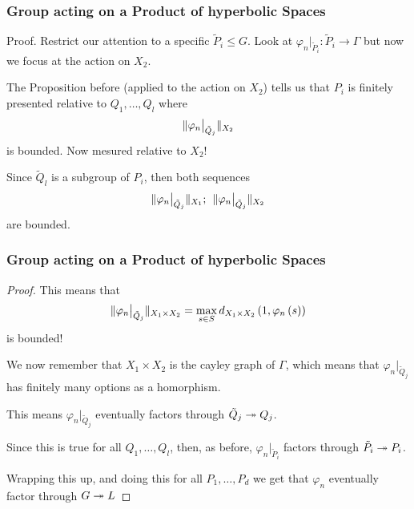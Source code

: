 \documentclass{beamer}[10]
\begin{document}
\begin{frame}
    \frametitle{Group acting on a Product of hyperbolic Spaces}
    \begin{block}{Proof.}
        Restrict our attention to a specific $\tilde{P}_i \leq G$. \pause
        Look at $\varphi_{n}\big\vert_{\tilde{P}_i}: \tilde{P}_i \to \Gamma$ but now we focus at the action on $X_2$. \pause

        The Proposition before (applied to the action on $X_2$) tells us that $P_i$ is finitely presented relative to $Q_1, \ldots, Q_l$ where
        \begin{equation*}
            \lVert \varphi_{n}\big\vert_{\tilde{Q}_j} \rVert_{X_2}
        \end{equation*}
        is bounded. Now mesured relative to $X_2$! \pause

        Since $\tilde{Q}_l$ is a subgroup of $P_i$, then both sequences
        \begin{equation*}
            \lVert \varphi_{n}\big\vert_{\tilde{Q}_j} \rVert_{X_1};\hspace{1ex}\lVert \varphi_{n}\big\vert_{\tilde{Q}_j} \rVert_{X_2}
        \end{equation*}
        are bounded. 
    \end{block}
\end{frame}

\begin{frame}
    \frametitle{Group acting on a Product of hyperbolic Spaces}
    \begin{proof}
    
        \pause This means that 
        \begin{equation*}
            \lVert \varphi_{n}\big\vert_{\tilde{Q}_j} \rVert_{X_1 \times X_2} = \max_{s\in S} d_{X_1 \times X_2} \left( 1, \varphi_n \left( s \right) \right)
        \end{equation*} 
        is bounded! \pause

        We now remember that $X_1 \times X_2$ is the cayley graph of $\Gamma$, which means that $\varphi_{n}\big\vert_{\tilde{Q}_j}$ has finitely many options as a homorphism.\pause

        This means $\varphi_{n}\big\vert_{\tilde{Q}_j}$ eventually factors through $\tilde{Q}_j \twoheadrightarrow Q_j$. \pause
        
        Since this is true for all $Q_1, \ldots, Q_l$, then, as before, $\varphi_{n}\big\vert_{\tilde{P}_i}$ factors through $\tilde{P}_i \twoheadrightarrow P_i$.\pause

        Wrapping this up, and doing this for all $P_1, \ldots, P_d$ we get that $\varphi_n$ eventually factor through $G \twoheadrightarrow L$

    \end{proof}
\end{frame}
\end{document}
